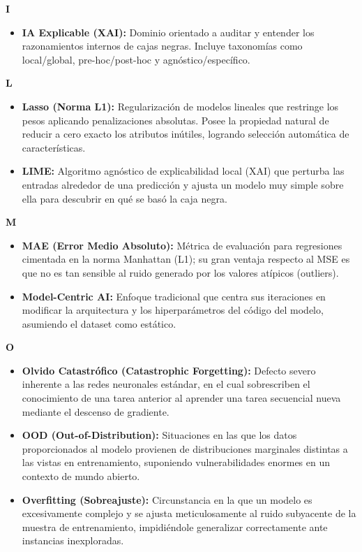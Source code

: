 \documentclass[12pt]{book} %
\providecommand{\tightlist}{%
  \setlength{\itemsep}{0pt}\setlength{\parskip}{0pt}}
\begin{document}
\textbf{I}

\begin{itemize}
\tightlist
\item
  \textbf{IA Explicable (XAI):} Dominio orientado a auditar y entender
  los razonamientos internos de cajas negras. Incluye taxonomías como
  local/global, pre-hoc/post-hoc y agnóstico/específico.
\end{itemize}

\textbf{L}

\begin{itemize}
\tightlist
\item
  \textbf{Lasso (Norma L1):} Regularización de modelos lineales que
  restringe los pesos aplicando penalizaciones absolutas. Posee la
  propiedad natural de reducir a cero exacto los atributos inútiles,
  logrando selección automática de características.
\item
  \textbf{LIME:} Algoritmo agnóstico de explicabilidad local (XAI) que
  perturba las entradas alrededor de una predicción y ajusta un modelo
  muy simple sobre ella para descubrir en qué se basó la caja negra.
\end{itemize}

\textbf{M}

\begin{itemize}
\tightlist
\item
  \textbf{MAE (Error Medio Absoluto):} Métrica de evaluación para
  regresiones cimentada en la norma Manhattan (L1); su gran ventaja
  respecto al MSE es que no es tan sensible al ruido generado por los
  valores atípicos (outliers).
\item
  \textbf{Model-Centric AI:} Enfoque tradicional que centra sus
  iteraciones en modificar la arquitectura y los hiperparámetros del
  código del modelo, asumiendo el dataset como estático.
\end{itemize}

\textbf{O}

\begin{itemize}
\tightlist
\item
  \textbf{Olvido Catastrófico (Catastrophic Forgetting):} Defecto severo
  inherente a las redes neuronales estándar, en el cual sobrescriben el
  conocimiento de una tarea anterior al aprender una tarea secuencial
  nueva mediante el descenso de gradiente.
\item
  \textbf{OOD (Out-of-Distribution):} Situaciones en las que los datos
  proporcionados al modelo provienen de distribuciones marginales
  distintas a las vistas en entrenamiento, suponiendo vulnerabilidades
  enormes en un contexto de mundo abierto.
\item
  \textbf{Overfitting (Sobreajuste):} Circunstancia en la que un modelo
  es excesivamente complejo y se ajusta meticulosamente al ruido
  subyacente de la muestra de entrenamiento, impidiéndole generalizar
  correctamente ante instancias inexploradas.
\end{itemize}
\end{document}
